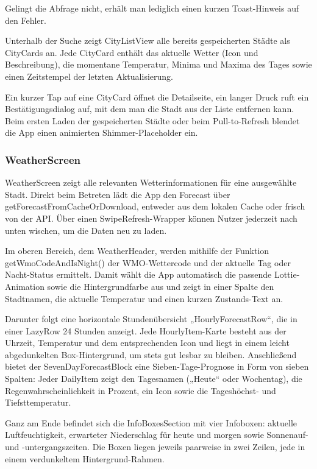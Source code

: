 \documentclass{article}
\begin{document}
Gelingt die Abfrage nicht, erhält man lediglich einen kurzen Toast-Hinweis auf den Fehler.

Unterhalb der Suche zeigt CityListView alle bereits gespeicherten Städte als CityCards an. Jede CityCard enthält das aktuelle Wetter (Icon und Beschreibung), die momentane Temperatur, Minima und Maxima des Tages sowie einen Zeitstempel der letzten Aktualisierung.

Ein kurzer Tap auf eine CityCard öffnet die Detailseite, ein langer Druck ruft ein Bestätigungsdialog auf, mit dem man die Stadt aus der Liste entfernen kann. Beim ersten Laden der gespeicherten Städte oder beim Pull-to-Refresh blendet die App einen animierten Shimmer-Placeholder ein.

\subsubsection{WeatherScreen}

WeatherScreen zeigt alle relevanten Wetterinformationen für eine ausgewählte Stadt. Direkt beim Betreten lädt die App den Forecast über getForecastFromCacheOrDownload, entweder aus dem lokalen Cache oder frisch von der API. Über einen SwipeRefresh-Wrapper können Nutzer jederzeit nach unten wischen, um die Daten neu zu laden.

Im oberen Bereich, dem WeatherHeader, werden mithilfe der Funktion getWmoCodeAndIsNight() der WMO-Wettercode und der aktuelle Tag oder Nacht-Status ermittelt. Damit wählt die App automatisch die passende Lottie-Animation sowie die Hintergrundfarbe aus und zeigt in einer Spalte den Stadtnamen, die aktuelle Temperatur und einen kurzen Zustands-Text an.

Darunter folgt eine horizontale Stundenübersicht „HourlyForecastRow“, die in einer LazyRow 24 Stunden anzeigt. Jede HourlyItem-Karte besteht aus der Uhrzeit, Temperatur und dem entsprechenden Icon und liegt in einem leicht abgedunkelten Box-Hintergrund, um stets gut lesbar zu bleiben. Anschließend bietet der SevenDayForecastBlock eine Sieben-Tage-Prognose in Form von sieben Spalten: Jeder DailyItem zeigt den Tagesnamen („Heute“ oder Wochentag), die Regenwahrscheinlichkeit in Prozent, ein Icon sowie die Tageshöchst- und Tiefsttemperatur.

Ganz am Ende befindet sich die InfoBoxesSection mit vier Infoboxen: aktuelle Luftfeuchtigkeit, erwarteter Niederschlag für heute und morgen sowie Sonnenauf- und -untergangszeiten. Die Boxen liegen jeweils paarweise in zwei Zeilen, jede in einem verdunkeltem Hintergrund-Rahmen.
\end{document}

